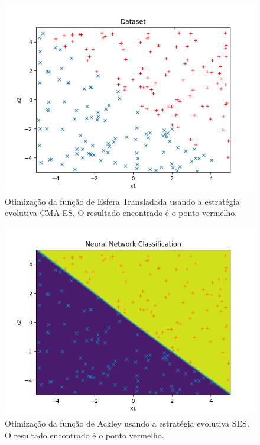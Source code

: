 \documentclass[conference]{IEEEtran}
\begin{document}
\begin{figure}[htbp]
\centering
\centerline{\includegraphics[scale=0.5]{imagens/sum_gt_zero/dataset.png}}
\caption{Otimização da função de Esfera Transladada usando a estratégia evolutiva CMA-ES. O resultado encontrado é o ponto vermelho.}
\label{sum_gt_zero/dataset}
\end{figure}

\begin{figure}[htbp]
\centering
\centerline{\includegraphics[scale=0.5]{imagens/sum_gt_zero/neural_net_classification.png}}
\caption{Otimização da função de Ackley usando a estratégia evolutiva SES. O resultado encontrado é o ponto vermelho.}
\label{sum_gt_zero/neural_net_classification}
\end{figure} 
\end{document}
